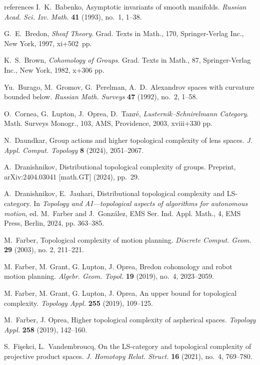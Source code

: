 \documentclass[amscd,amssymb,verbatim,11pt]{amsart}
\theoremstyle{plain}
\theoremstyle{definition}
\begin{document}
\begin{thebibliography}{references}
 I.~K.~Babenko, Asymptotic invariants of smooth manifolds. \emph{Russian Acad. Sci. Izv. Math.} \textbf{41} (1993), no.~1, 1--38.

 G.~E.~Bredon, \emph{Sheaf Theory}. Grad. Texts in Math., 170, Springer-Verlag Inc., New York, 1997, xi+502~pp.

 K.~S.~Brown, \emph{Cohomology of Groups}. Grad. Texts in Math., 87, Springer-Verlag Inc., New York, 1982, x+306 pp.

 Yu.~Burago, M.~Gromov, G.~Perelman, A.~D.~Alexandrov spaces with curvature bounded below. \emph{Russian Math. Surveys} \textbf{47} (1992), no.~2, 1--58.

 O.~Cornea, G.~Lupton, J.~Oprea, D.~Tanré, \emph{Lusternik--Schnirelmann Category}. Math. Surveys Monogr., 103, AMS, Providence, 2003, xviii+330 pp.

 N.~Daundkar, Group actions and higher topological complexity of lens spaces. \emph{J. Appl. Comput. Topology} \textbf{8} (2024), 2051--2067.

 A.~Dranishnikov, Distributional topological complexity of groups. Preprint, arXiv:2404.03041 [math.GT] (2024), pp.~29.

 A.~Dranishnikov, E.~Jauhari, Distributional topological complexity and LS-category. In \emph{Topology and AI---topological aspects of algorithms for autonomous motion}, ed. M.~Farber and J.~Gonz\'alez, EMS Ser. Ind. Appl. Math., 4, EMS Press, Berlin, 2024, pp. 363–385.

 M.~Farber, Topological complexity of motion planning. \textit{Discrete Comput. Geom.} \textbf{29} (2003), no. 2, 211--221.
    
 M. Farber, M. Grant, G. Lupton, J. Oprea, Bredon cohomology and robot motion planning. \emph{Algebr. Geom. Topol.} \textbf{19} (2019), no.~4, 2023--2059.

 M. Farber, M. Grant, G. Lupton, J. Oprea, An upper bound for topological complexity. \emph{Topology Appl.} \textbf{255} (2019), 109--125.

M.~Farber, J. Oprea, Higher topological complexity of aspherical spaces. \emph{Topology Appl.} \textbf{258} (2019), 142--160.

 S.~Fi\c{s}ekci, L.~Vandembroucq, On the LS-category and topological complexity of projective product spaces. \emph{J. Homotopy Relat. Struct.} \textbf{16} (2021), no.~4, 769--780.


\end{thebibliography}
\end{document}
